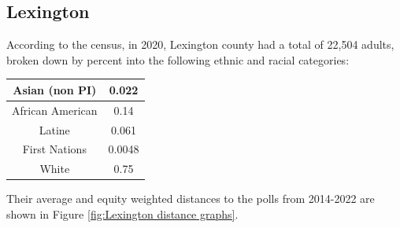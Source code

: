 \documentclass[11pt]{article}
\theoremstyle{remark}
\theoremstyle{definition}
\begin{document}
\subsection{Lexington \label{sec:Lexington distances}}
According to the census, in 2020, Lexington county had a total of 22,504  adults, broken down by percent into the following ethnic and racial categories:

\begin{tabular} {| c | c |} 
	\hline
	Asian (non PI) &  0.022 \\ \hline
	African American & 0.14 \\ \hline
	Latine & 0.061 \\ \hline
	First Nations & 0.0048 \\ \hline
	White  & 0.75 \\ \hline
\end{tabular}


Their average and equity weighted distances to the polls from 2014-2022 are shown in Figure \ref{fig:Lexington distance graphs}.
\end{document}
